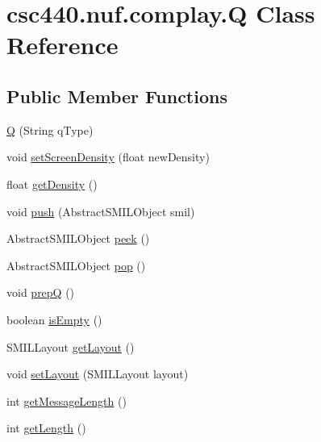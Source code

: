 \hypertarget{classcsc440_1_1nuf_1_1complay_1_1_q}{\section{csc440.\-nuf.\-complay.\-Q Class Reference}
\label{classcsc440_1_1nuf_1_1complay_1_1_q}
}
\subsection*{Public Member Functions}
\begin{DoxyCompactItemize}
\item 
\hyperlink{classcsc440_1_1nuf_1_1complay_1_1_q_ad72dc784bb75e4e78b3b612e2d57d85c}{Q} (String q\-Type)
\item 
void \hyperlink{classcsc440_1_1nuf_1_1complay_1_1_q_a89a196928ffab3aa6d54f6029a6c22db}{set\-Screen\-Density} (float new\-Density)
\item 
float \hyperlink{classcsc440_1_1nuf_1_1complay_1_1_q_ab4cfe319143b0b8147222d71b1a7e474}{get\-Density} ()
\item 
void \hyperlink{classcsc440_1_1nuf_1_1complay_1_1_q_aaa9e1371272a3d71932a7b753155741b}{push} (Abstract\-S\-M\-I\-L\-Object smil)
\item 
Abstract\-S\-M\-I\-L\-Object \hyperlink{classcsc440_1_1nuf_1_1complay_1_1_q_a1909fe89eabfc73398d99c7dc4c9b946}{peek} ()
\item 
Abstract\-S\-M\-I\-L\-Object \hyperlink{classcsc440_1_1nuf_1_1complay_1_1_q_af768e2d386701d7d3ee1078e08a21422}{pop} ()
\item 
void \hyperlink{classcsc440_1_1nuf_1_1complay_1_1_q_a819204376514251f5ca8edc5245b950b}{prep\-Q} ()
\item 
boolean \hyperlink{classcsc440_1_1nuf_1_1complay_1_1_q_a6c333b08908191e022f23b68989c263a}{is\-Empty} ()
\item 
S\-M\-I\-L\-Layout \hyperlink{classcsc440_1_1nuf_1_1complay_1_1_q_a37b180778c7a88f92b1feee52d171a18}{get\-Layout} ()
\item 
void \hyperlink{classcsc440_1_1nuf_1_1complay_1_1_q_a37ca528aeec4df81de99fe3cec490372}{set\-Layout} (S\-M\-I\-L\-Layout layout)
\item 
int \hyperlink{classcsc440_1_1nuf_1_1complay_1_1_q_a71e507602b30ba7ca249efedf6ddabad}{get\-Message\-Length} ()
\item 
int \hyperlink{classcsc440_1_1nuf_1_1complay_1_1_q_ad07780ee275df50700092486b77010dd}{get\-Length} ()
\item 

\end{DoxyCompactItemize}

